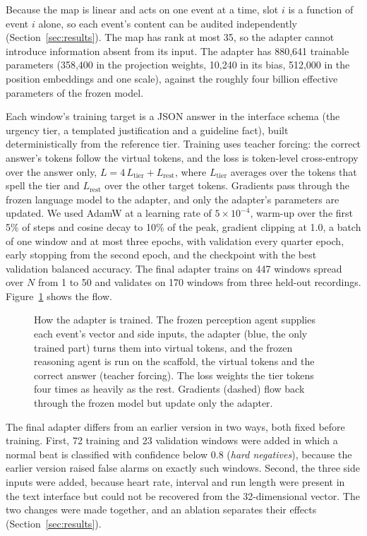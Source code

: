 Because the map is linear and acts on one event at a time, slot $i$ is a function of event $i$ alone, so each event's content can be audited independently (Section~\ref{sec:results}). The map has rank at most 35, so the adapter cannot introduce information absent from its input. The adapter has 880,641 trainable parameters (358,400 in the projection weights, 10,240 in its bias, 512,000 in the position embeddings and one scale), against the roughly four billion effective parameters of the frozen model.

Each window's training target is a JSON answer in the interface schema (the urgency tier, a templated justification and a guideline fact), built deterministically from the reference tier. Training uses teacher forcing: the correct answer's tokens follow the virtual tokens, and the loss is token-level cross-entropy over the answer only, $L = 4\,L_{\mathrm{tier}} + L_{\mathrm{rest}}$, where $L_{\mathrm{tier}}$ averages over the tokens that spell the tier and $L_{\mathrm{rest}}$ over the other target tokens. Gradients pass through the frozen language model to the adapter, and only the adapter's parameters are updated. We used AdamW at a learning rate of $5\times10^{-4}$, warm-up over the first 5\% of steps and cosine decay to 10\% of the peak, gradient clipping at 1.0, a batch of one window and at most three epochs, with validation every quarter epoch, early stopping from the second epoch, and the checkpoint with the best validation balanced accuracy. The final adapter trains on 447 windows spread over $N$ from 1 to 50 and validates on 170 windows from three held-out recordings. Figure~\ref{fig:training} shows the flow.

\begin{figure}[t]
\centering
{}
\caption{How the adapter is trained. The frozen perception agent supplies each event's vector and side inputs, the adapter (blue, the only trained part) turns them into virtual tokens, and the frozen reasoning agent is run on the scaffold, the virtual tokens and the correct answer (teacher forcing). The loss weights the tier tokens four times as heavily as the rest. Gradients (dashed) flow back through the frozen model but update only the adapter.}
\label{fig:training}
\end{figure}

The final adapter differs from an earlier version in two ways, both fixed before training. First, 72 training and 23 validation windows were added in which a normal beat is classified with confidence below 0.8 (\emph{hard negatives}), because the earlier version raised false alarms on exactly such windows. Second, the three side inputs were added, because heart rate, interval and run length were present in the text interface but could not be recovered from the 32-dimensional vector. The two changes were made together, and an ablation separates their effects (Section~\ref{sec:results}).

